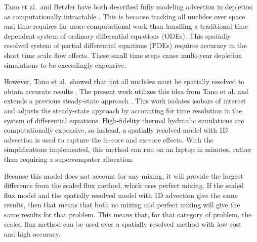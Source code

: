 \documentclass{style/nseJournal}
\begin{document}
Tano et al.\ and Betzler have both described fully modeling advection in depletion as computationally intractable \cite{tanocoupled2023, betzler_liquid-fueled_2021}.
This is because tracking all nuclides over space and time requires far more computational work than handling a traditional time dependent system of ordinary differential equations (ODEs).
This spatially resolved system of partial differential equations (PDEs) requires accuracy in the short time scale flow effects.
These small time steps cause multi-year depletion simulations to be exceedingly expensive.



However, Tano et al.\ showed that not all nuclides must be spatially resolved to obtain accurate results \cite{tanocoupled2023}.
The present work utilizes this idea from Tano et al. and extends a previous steady-state approach \cite{shahbazi_steady-state_2022}.
This work isolates isobars of interest and adjusts the steady-state approach by accounting for time resolution in the system of differential equations.
High-fidelity thermal hydraulic simulations are computationally expensive, so instead, a spatially resolved model with 1D advection is used to capture the in-core and ex-core effects.
With the simplifications implemented, this method can run on an laptop in minutes, rather than requiring a supercomputer allocation.

Because this model does not account for any mixing, it will provide the largest difference from the scaled flux method, which uses perfect mixing.
If the scaled flux model and the spatially resolved model with 1D advection give the same results, then that means that both no mixing and perfect mixing will give the same results for that problem.
This means that, for that category of problem, the scaled flux method can be used over a spatially resolved method with low cost and high accuracy.
\end{document}
